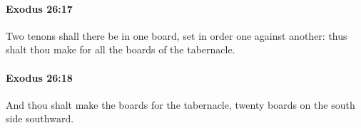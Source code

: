 		\paragraph{Exodus 26:17} %
			\label{EXODUS-26-17}

			Two tenons shall there be in one board, set in order one against another: thus shalt thou make for all the boards of the tabernacle.


		\paragraph{Exodus 26:18} %
			\label{EXODUS-26-18}

			And thou shalt make the boards for the tabernacle, twenty boards on the south side southward.


